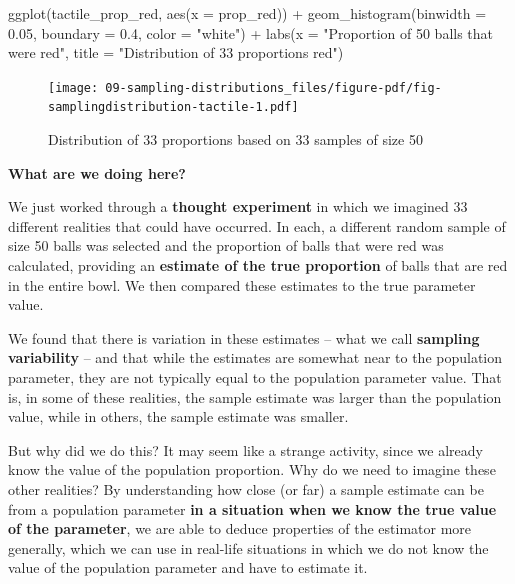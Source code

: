 \documentclass[
  letterpaper,
  DIV=11,
  numbers=noendperiod]{scrreprt}
\newenvironment{Shaded}{\begin{snugshade}}{\end{snugshade}}
\newcommand{\AttributeTok}[1]{\textcolor[rgb]{0.40,0.45,0.13}{#1}}
\newcommand{\FloatTok}[1]{\textcolor[rgb]{0.68,0.00,0.00}{#1}}
\newcommand{\FunctionTok}[1]{\textcolor[rgb]{0.28,0.35,0.67}{#1}}
\newcommand{\NormalTok}[1]{\textcolor[rgb]{0.00,0.23,0.31}{#1}}
\newcommand{\SpecialCharTok}[1]{\textcolor[rgb]{0.37,0.37,0.37}{#1}}
\newcommand{\StringTok}[1]{\textcolor[rgb]{0.13,0.47,0.30}{#1}}
\theoremstyle{definition}
\theoremstyle{remark}
\begin{document}
\begin{Shaded}
\begin{Highlighting}[]
\FunctionTok{ggplot}\NormalTok{(tactile\_prop\_red, }\FunctionTok{aes}\NormalTok{(}\AttributeTok{x =}\NormalTok{ prop\_red)) }\SpecialCharTok{+}
  \FunctionTok{geom\_histogram}\NormalTok{(}\AttributeTok{binwidth =} \FloatTok{0.05}\NormalTok{, }\AttributeTok{boundary =} \FloatTok{0.4}\NormalTok{, }\AttributeTok{color =} \StringTok{"white"}\NormalTok{) }\SpecialCharTok{+}
  \FunctionTok{labs}\NormalTok{(}\AttributeTok{x =} \StringTok{"Proportion of 50 balls that were red"}\NormalTok{, }
       \AttributeTok{title =} \StringTok{"Distribution of 33 proportions red"}\NormalTok{) }
\end{Highlighting}
\end{Shaded}

\begin{figure}

{\centering \texttt{[image: 09-sampling-distributions\_files/figure-pdf/fig-samplingdistribution-tactile-1.pdf]}

}

\caption{\label{fig-samplingdistribution-tactile}Distribution of 33
proportions based on 33 samples of size 50}

\end{figure}

\textbf{What are we doing here?}

We just worked through a \textbf{thought experiment} in which we
imagined 33 different realities that could have occurred. In each, a
different random sample of size 50 balls was selected and the proportion
of balls that were red was calculated, providing an \textbf{estimate of
the true proportion} of balls that are red in the entire bowl. We then
compared these estimates to the true parameter value.

We found that there is variation in these estimates -- what we call
\textbf{sampling variability} -- and that while the estimates are
somewhat near to the population parameter, they are not typically equal
to the population parameter value. That is, in some of these realities,
the sample estimate was larger than the population value, while in
others, the sample estimate was smaller.

But why did we do this? It may seem like a strange activity, since we
already know the value of the population proportion. Why do we need to
imagine these other realities? By understanding how close (or far) a
sample estimate can be from a population parameter \textbf{in a
situation when we know the true value of the parameter}, we are able to
deduce properties of the estimator more generally, which we can use in
real-life situations in which we do not know the value of the population
parameter and have to estimate it.
\end{document}
